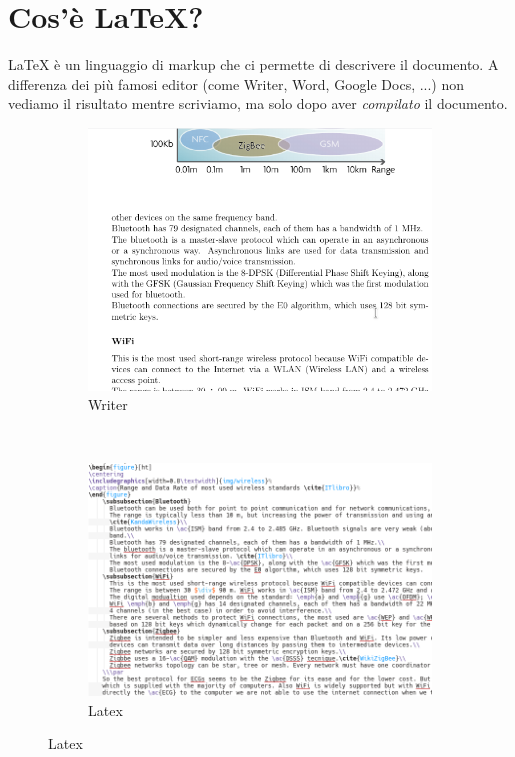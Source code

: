 \documentclass[a4paper,12pt]{article}
\newcommand{\1}{\ensuremath{\mathds{1}}}
\begin{document}
\section{Cos'\`{e} \LaTeX?}
  \LaTeX{} è un linguaggio di markup che ci permette di descrivere il documento. A differenza dei più famosi editor (come Writer, Word, Google Docs, ...) non vediamo il risultato mentre scriviamo, ma solo dopo aver \emph{compilato} il documento.
  \begin{figure}[!h]
    \centering
    \begin{subfigure}[b]{0.4\textwidth}
        \includegraphics[width=\textwidth]{img/writer}
        \caption{Writer}
    \end{subfigure}~
    \begin{subfigure}[b]{0.4\textwidth}
        \includegraphics[width=\textwidth]{img/latex_source}
        \caption{Latex}
    \end{subfigure}
  \end{figure}
\end{document}
